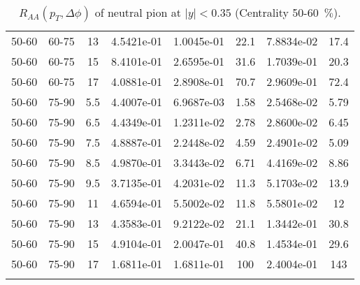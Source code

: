 \begin{longtable}{|cccccccc|}
50-60 & 60-75 & 13 & 4.5421e-01 & 1.0045e-01 & 22.1 & 7.8834e-02 & 17.4 \\ 
50-60 & 60-75 & 15 & 8.4101e-01 & 2.6595e-01 & 31.6 & 1.7039e-01 & 20.3 \\ 
50-60 & 60-75 & 17 & 4.0881e-01 & 2.8908e-01 & 70.7 & 2.9609e-01 & 72.4 \\ 
\hline
50-60 & 75-90 & 5.5 & 4.4007e-01 & 6.9687e-03 & 1.58 & 2.5468e-02 & 5.79 \\ 
50-60 & 75-90 & 6.5 & 4.4349e-01 & 1.2311e-02 & 2.78 & 2.8600e-02 & 6.45 \\ 
50-60 & 75-90 & 7.5 & 4.8887e-01 & 2.2448e-02 & 4.59 & 2.4901e-02 & 5.09 \\ 
50-60 & 75-90 & 8.5 & 4.9870e-01 & 3.3443e-02 & 6.71 & 4.4169e-02 & 8.86 \\ 
50-60 & 75-90 & 9.5 & 3.7135e-01 & 4.2031e-02 & 11.3 & 5.1703e-02 & 13.9 \\ 
50-60 & 75-90 & 11 & 4.6594e-01 & 5.5002e-02 & 11.8 & 5.5801e-02 & 12 \\ 
50-60 & 75-90 & 13 & 4.3583e-01 & 9.2122e-02 & 21.1 & 1.3442e-01 & 30.8 \\ 
50-60 & 75-90 & 15 & 4.9104e-01 & 2.0047e-01 & 40.8 & 1.4534e-01 & 29.6 \\ 
50-60 & 75-90 & 17 & 1.6811e-01 & 1.6811e-01 & 100 & 2.4004e-01 & 143 \\ 
\hline
\caption{$R_{AA}(p_{T},\Delta\phi)$ of neutral pion at $|y|<0.35$ (Centrality 50-60~$\%$).}
\end{longtable}
            
            
